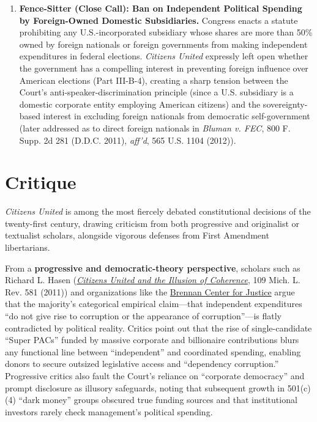 \documentclass[12pt]{article}
\begin{document}
\begin{enumerate}
  \item \textbf{Fence-Sitter (Close Call): Ban on Independent Political Spending by Foreign-Owned Domestic Subsidiaries.} Congress enacts a statute prohibiting any U.S.-incorporated subsidiary whose shares are more than 50\% owned by foreign nationals or foreign governments from making independent expenditures in federal elections. \textit{Citizens United} expressly left open whether the government has a compelling interest in preventing foreign influence over American elections (Part III-B-4), creating a sharp tension between the Court's anti-speaker-discrimination principle (since a U.S. subsidiary is a domestic corporate entity employing American citizens) and the sovereignty-based interest in excluding foreign nationals from democratic self-government (later addressed as to direct foreign nationals in \textit{Bluman v. FEC}, 800 F. Supp. 2d 281 (D.D.C. 2011), \textit{aff'd}, 565 U.S. 1104 (2012)).
\end{enumerate}

\section{Critique}

\textit{Citizens United} is among the most fiercely debated constitutional decisions of the twenty-first century, drawing criticism from both progressive and originalist or textualist scholars, alongside vigorous defenses from First Amendment libertarians.

From a \textbf{progressive and democratic-theory perspective}, scholars such as Richard L. Hasen (\href{https://repository.law.umich.edu/context/mlr/article/1166/viewcontent/Hasen_CITIZENS_20UNITED_20AND_20THE_20ILLUSION_20OF_20COHERENCE.pdf}{\textit{Citizens United and the Illusion of Coherence}}, 109 Mich. L. Rev. 581 (2011)) and organizations like the \href{https://www.brennancenter.org/our-work/research-reports/citizens-united-explained}{Brennan Center for Justice} argue that the majority's categorical empirical claim---that independent expenditures ``do not give rise to corruption or the appearance of corruption''---is flatly contradicted by political reality. Critics point out that the rise of single-candidate ``Super PACs'' funded by massive corporate and billionaire contributions blurs any functional line between ``independent'' and coordinated spending, enabling donors to secure outsized legislative access and ``dependency corruption.'' Progressive critics also fault the Court's reliance on ``corporate democracy'' and prompt disclosure as illusory safeguards, noting that subsequent growth in 501(c)(4) ``dark money'' groups obscured true funding sources and that institutional investors rarely check management's political spending.
\end{document}
